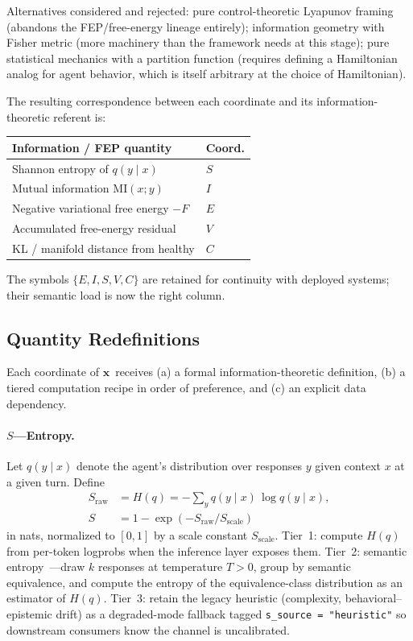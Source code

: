\documentclass[11pt,twocolumn]{article}
\newcommand{\eisv}{\ensuremath{\mathbf{x}}}
\begin{document}
Alternatives considered and rejected: pure control-theoretic
Lyapunov framing (abandons the FEP/free-energy lineage entirely);
information geometry with Fisher metric (more machinery than the
framework needs at this stage); pure statistical mechanics with a
partition function (requires defining a Hamiltonian analog for agent
behavior, which is itself arbitrary at the choice of Hamiltonian).

The resulting correspondence between each coordinate and its
information-theoretic referent is:

\begin{center}
\footnotesize
\begin{tabular}{@{}ll@{}}
\toprule
\textbf{Information / FEP quantity} & \textbf{Coord.} \\
\midrule
Shannon entropy of $q(y \mid x)$        & $S$ \\
Mutual information $\mathrm{MI}(x; y)$  & $I$ \\
Negative variational free energy $-F$   & $E$ \\
Accumulated free-energy residual        & $V$ \\
KL / manifold distance from healthy     & $C$ \\
\bottomrule
\end{tabular}
\end{center}

The symbols $\{E, I, S, V, C\}$ are retained for continuity with
deployed systems; their semantic load is now the right column.

\subsection{Quantity Redefinitions}
\label{sec:grounding-quantities}

Each coordinate of \eisv\ receives (a) a formal information-theoretic
definition, (b) a tiered computation recipe in order of preference,
and (c) an explicit data dependency.

\paragraph{$S$---Entropy.}
Let $q(y \mid x)$ denote the agent's distribution over responses $y$
given context $x$ at a given turn. Define
\begin{align}
  S_{\text{raw}} &= H(q) = -\sum_{y} q(y \mid x)\,\log q(y \mid x), \nonumber \\
  S &= 1 - \exp(-S_{\text{raw}} / S_{\text{scale}})
  \label{eq:S-grounded}
\end{align}
in nats, normalized to $[0,1]$ by a scale constant
$S_{\text{scale}}$. Tier~1: compute $H(q)$ from per-token logprobs
when the inference layer exposes them. Tier~2:
semantic entropy~\cite{kuhn2023semantic}---draw $k$ responses at
temperature $T > 0$, group by semantic equivalence, and compute the
entropy of the equivalence-class distribution as an estimator of
$H(q)$.
Tier~3: retain the legacy heuristic (complexity, behavioral--epistemic drift) as a
degraded-mode fallback tagged \texttt{s\_source = "heuristic"} so
downstream consumers know the channel is uncalibrated.
\end{document}
